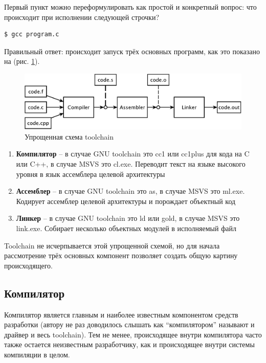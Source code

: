 \documentclass[a4paper,12pt,oneside]{article}
\begin{document}
Первый пункт можно переформулировать как простой и конкретный вопрос: что происходит при исполнении следующей строчки?

\begin{verbatim}
$ gcc program.c
\end{verbatim}

Правильный ответ: происходит запуск трёх основных программ, как это показано на (рис. \ref{fig:simplified_scheme}).

\begin{figure}[ht]
\centering
\includegraphics[width=1.0\textwidth]{illustrations/simplified-scheme-crop.pdf}
\caption{Упрощенная схема toolchain}
\label{fig:simplified_scheme}
\end{figure}

\begin{enumerate}
\item \textbf{Компилятор} -- в случае GNU toolchain это cc1 или cc1plus для кода на C или C++, в случае MSVS это cl.exe. Переводит текст на языке высокого уровня в язык ассемблера целевой архитектуры
\item \textbf{Ассемблер} -- в случае GNU toolchain это as, в случае MSVS это ml.exe. Кодирует ассемблер целевой архитектуры и порождает объектный код
\item \textbf{Линкер} -- в случае GNU toolchain это ld или gold, в случае MSVS это link.exe. Собирает несколько объектных модулей в исполняемый файл
\end{enumerate}

Toolchain не исчерпывается этой упрощенной схемой, но для начала рассмотрение трёх основных компонент позволяет создать общую картину происходящего.

\subsection{Компилятор}\label{subsec:Compiler}

Компилятор является главным и наиболее известным компонентом средств разработки (автору не раз доводилось слышать как ``компилятором'' называют и драйвер и весь toolchain). Тем не менее, происходящее внутри компилятора часто также остается неизвестным разработчику, как и происходящее внутри системы компиляции в целом.
\end{document}
